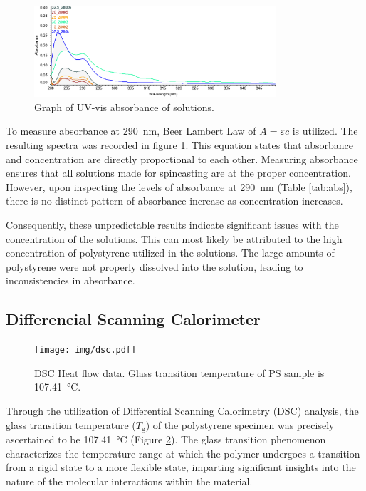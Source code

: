 \documentclass[twocolumn]{article}
\begin{document}
                \begin{figure}
                    \centering
                    \includegraphics[width=0.8\textwidth]{img/uvvis.png}
                    \caption{Graph of UV-vis absorbance of solutions.}\label{fig:uv-vis}
                \end{figure}
                To measure absorbance at \qty{290}{\nano\meter}, Beer Lambert Law of $A = \varepsilon c$ is utilized. The resulting spectra was recorded in figure \ref{fig:uv-vis}. This equation states that absorbance and concentration are directly proportional to each other. Measuring absorbance ensures that all solutions made for spincasting are at the proper concentration. However, upon inspecting the levels of absorbance at \qty{290}{\nano\meter} (Table \ref{tab:abs}), there is no distinct pattern of absorbance increase as concentration increases.
                
                Consequently, these unpredictable results indicate significant issues with the concentration of the solutions. This can most likely be attributed to the high concentration of polystyrene utilized in the solutions. The large amounts of  polystyrene were not properly dissolved into the solution, leading to inconsistencies in absorbance.                

            \subsection{Differencial Scanning Calorimeter}
                \begin{figure}
                    \centering
                    \texttt{[image: img/dsc.pdf]}
                    \caption{DSC Heat flow data. Glass transition temperature of PS sample is \qty{107.41}{\degreeCelsius}.}\label{fig:dsc}
                \end{figure}
                Through the utilization of Differential Scanning Calorimetry (DSC) analysis, the glass transition temperature ($T_\text{g}$) of the polystyrene specimen was precisely ascertained to be \qty{107.41}{\degreeCelsius} (Figure \ref{fig:dsc}). The glass transition phenomenon characterizes the temperature range at which the polymer undergoes a transition from a rigid state to a more flexible state, imparting significant insights into the nature of the molecular interactions within the material. 
                
\end{document}
